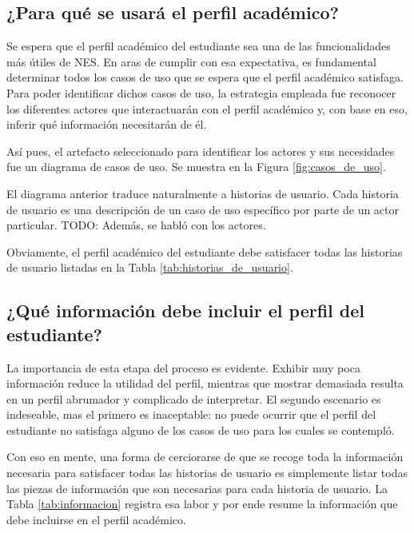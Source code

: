 \subsection{¿Para qué se usará el perfil académico?}

Se espera que el perfil académico del estudiante sea una de las funcionalidades más útiles de \gls{NES}. En aras de cumplir con esa expectativa, es fundamental determinar todos los casos de uso que se espera que el perfil académico satisfaga. Para poder identificar dichos casos de uso, la estrategia empleada fue reconocer los diferentes actores que interactuarán con el perfil académico y, con base en eso, inferir qué información necesitarán de él.

Así pues, el artefacto seleccionado para identificar los actores y sus necesidades fue un diagrama de casos de uso. Se muestra en la Figura \ref{fig:casos_de_uso}.


El diagrama anterior traduce naturalmente a historias de usuario. Cada historia de usuario es una descripción de un caso de uso específico por parte de un actor particular. 
TODO: Además, se habló con los actores.

Obviamente, el perfil académico del estudiante debe satisfacer todas las historias de usuario listadas en la Tabla \ref{tab:historias_de_usuario}.

\subsection{¿Qué información debe incluir el perfil del estudiante?}

La importancia de esta etapa del proceso es evidente. Exhibir muy poca información reduce la utilidad del perfil, mientras que mostrar demasiada resulta en un perfil abrumador y complicado de interpretar. El segundo escenario es indeseable, mas el primero es inaceptable: no puede ocurrir que el perfil del estudiante no satisfaga alguno de los casos de uso para los cuales se contempló.

Con eso en mente, una forma de cerciorarse de que se recoge toda la información necesaria para satisfacer todas las historias de usuario es simplemente listar todas las piezas de información que son necesarias para cada historia de usuario. La Tabla \ref{tab:informacion} registra esa labor y por ende resume la información que debe incluirse en el perfil académico.


